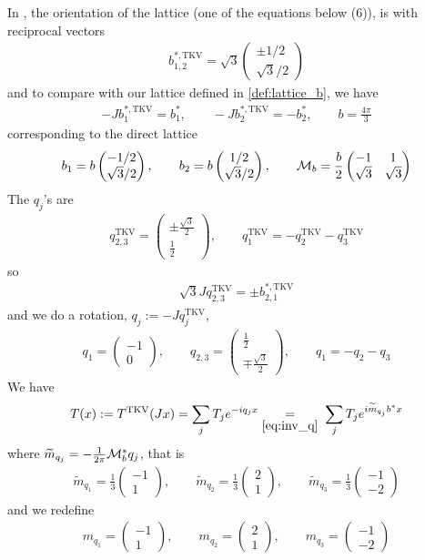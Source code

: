 \documentclass[11pt,a4paper,reqno,french,tikz]{amsart}
\newcommand{\f}[2]{\frac{#1}{#2}} %
\newcommand{\mat}[1]{\begin{pmatrix} #1 \end{pmatrix}} %
\begin{document}
In \cite{TarKruVis19}, the orientation of the lattice (one of the equations below (6)), is with reciprocal vectors
\begin{align*}
b^{*,\text{TKV}}_{1,2} = \sqrt 3 \mat{\pm 1/2 \\ \sqrt{3}/2}
\end{align*}
and to compare with our lattice defined in \eqref{def:lattice_b}, we have
\begin{align*}
-J b_1^{*,\text{TKV}} = b_1^*, \qquad -J b_2^{*,\text{TKV}} = -b_2^*, \qquad b = \f{4\pi}{3}
\end{align*}
corresponding to the direct lattice 
\begin{align*}
b_1 = b \mat{-1/2 \\ \sqrt{3} /2}, \qquad  b_2 = b\mat{1/2 \\ \sqrt{3}/2}, \qquad \cM_b = \f{b}{2} \mat{-1 & 1 \\ \sqrt{3} & \sqrt{3}}
\end{align*}
The $q_j$'s are
\begin{align*}
q^{\text{TKV}}_{2,3} = \mat{\pm\f{\sqrt 3}{2} \\ \f{1}{2}}, \qquad q^{\text{TKV}}_1 = -q^{\text{TKV}}_2 - q^{\text{TKV}}_3
\end{align*}
so
\begin{align*}
\sqrt{3} J q_{2,3}^{\text{TKV}} = \pm b_{2,1}^{*,\text{TKV}}
\end{align*}
and we do a rotation, $q_j := -J q^{\text{TKV}}_j$,
\begin{align*}
q_1 = \mat{-1 \\ 0}, \qquad q_{2,3} = \mat{\f 12 \\ \mp \f{\sqrt 3}{2} }, \qquad  q_1 = -q_2 - q_3
\end{align*}
We have
\begin{align*}
T(x) := T^{\text{TKV}}(Jx) = \sum_j T_j e^{-iq_j x} \underset{\substack{\eqref{eq:inv_q}}}{=} \; \sum_j T_j e^{i\widetilde{m}_{q_j} b^* x}
\end{align*}
where $\widetilde{m}_{q_j} = -\f{1}{2\pi} \cM_b^* q_j$, that is
\begin{align*}
\widetilde{m}_{q_1} = \f{1}{3} \mat{-1 \\ 1}, \qquad \widetilde{m}_{q_2} = \f{1}{3} \mat{2 \\ 1}, \qquad \widetilde{m}_{q_3} =  \f{1}{3} \mat{-1 \\ -2}
\end{align*}
and we redefine
\begin{align}\label{eq:fourier_TBM}
m_{q_1} =  \mat{-1 \\ 1}, \qquad m_{q_2} =  \mat{2 \\ 1}, \qquad m_{q_3} =   \mat{-1 \\ -2}
\end{align}
\end{document}
